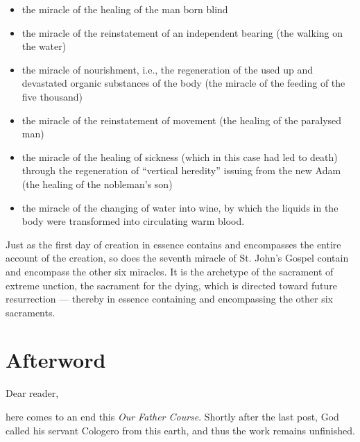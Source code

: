 \begin{itemize}
\item the miracle of the healing of the man born blind 
\item the miracle of the reinstatement of an independent bearing (the walking on the water) 
\item the miracle of nourishment, i.e., the regeneration of the used up and devastated organic substances of the body
(the miracle of the feeding of the five thousand) 
\item the miracle of the reinstatement of movement (the healing of the paralysed man) 
\item the miracle of the healing of sickness (which in this case had led to death) through the regeneration of ``vertical
heredity'' issuing from the new Adam (the healing of the nobleman's son) 
\item the miracle of the changing of water into wine, by which the liquids in the body were transformed into circulating
warm blood. 
\end{itemize}
\begin{quotex}
Just as the first day of creation in essence contains and encompasses the entire account of the creation, so does the seventh miracle of St. John's Gospel contain and encompass the other six miracles. It is the archetype of the sacrament of extreme unction, the sacrament for the dying, which is directed toward future resurrection — thereby in essence containing and encompassing the other six sacraments. 

\end{quotex}


\section{Afterword}

Dear reader,

here comes to an end this \textit{Our Father Course}. Shortly after the last post, God called his servant Cologero from this earth, and thus the work remains unfinished.